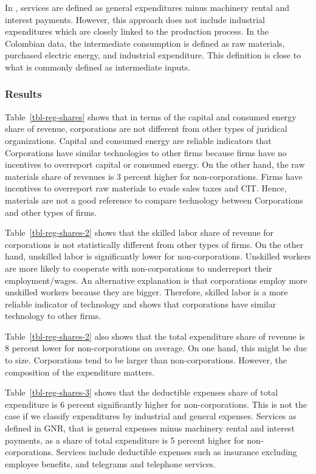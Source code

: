 \documentclass[
  12pt]{article}
\begin{document}
In \citet{Gandhi2020}, services are defined as general expenditures
minus machinery rental and interest payments. However, this approach
does not include industrial expenditures which are closely linked to the
production process. In the Colombian data, the intermediate consumption
is defined as raw materials, purchased electric energy, and industrial
expenditure. This definition is close to what is commonly defined as
intermediate inputs.

\subsubsection{Results}\label{results}

Table~\ref{tbl-reg-shares} shows that in terms of the capital and
consumed energy share of revenue, corporations are not different from
other types of juridical organizations. Capital and consumed energy are
reliable indicators that Corporations have similar technologies to other
firms because firms have no incentives to overreport capital or consumed
energy. On the other hand, the raw materials share of revenues is 3
percent higher for non-corporations. Firms have incentives to overreport
raw materials to evade sales taxes and CIT. Hence, materials are not a
good reference to compare technology between Corporations and other
types of firms.

Table~\ref{tbl-reg-shares-2} shows that the skilled labor share of
revenue for corporations is not statistically different from other types
of firms. On the other hand, unskilled labor is significantly lower for
non-corporations. Unskilled workers are more likely to cooperate with
non-corporations to underreport their employment/wages. An alternative
explanation is that corporations employ more unskilled workers because
they are bigger. Therefore, skilled labor is a more reliable indicator
of technology and shows that corporations have similar technology to
other firms.

Table~\ref{tbl-reg-shares-2} also shows that the total expenditure share
of revenue is 8 percent lower for non-corporations on average. On one
hand, this might be due to size. Corporations tend to be larger than
non-corporations. However, the composition of the expenditure matters.

Table~\ref{tbl-reg-shares-3} shows that the deductible expenses share of
total expenditure is 6 percent significantly higher for
non-corporations. This is not the case if we classify expenditures by
industrial and general expenses. Services as defined in GNR, that is
general expenses minus machinery rental and interest payments, as a
share of total expenditure is 5 percent higher for non-corporations.
Services include deductible expenses such as insurance excluding
employee benefits, and telegrams and telephone services.
\end{document}
